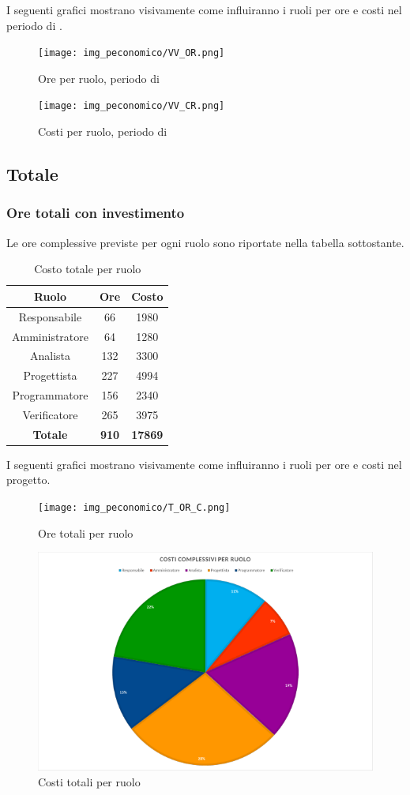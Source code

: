 I seguenti grafici mostrano visivamente come influiranno i ruoli per ore e costi nel periodo di \VV{}.
\begin{figure}[H]
	\centering
	\texttt{[image: img\_peconomico/VV\_OR.png]}
	\caption{Ore per ruolo, periodo di \VV}
\end{figure}
\begin{figure}[H]
	\centering
	\texttt{[image: img\_peconomico/VV\_CR.png]}
	\caption{Costi per ruolo, periodo di \VV}
\end{figure}

\subsection{Totale}
\subsubsection{Ore totali con investimento}
Le ore complessive previste per ogni ruolo sono riportate nella tabella sottostante.
\begin{table}[H]
	\centering
	\begin{tabular}{|c|c|c|}
		\hline
		\textbf{Ruolo} &
		\textbf{Ore} &
		\textbf{Costo} \\
		\hline
		Responsabile & 66 & 1980\\
		\hline
		Amministratore & 64 & 1280\\
		\hline
		Analista & 132 & 3300\\
		\hline
		Progettista & 227 & 4994 \\
		\hline
		Programmatore & 156 & 2340 \\
		\hline
		Verificatore & 265 & 3975\\
		\hline
		\textbf{Totale} & \textbf{910} & \textbf{17869} \\
		\hline
	\end{tabular}
	\caption{Costo totale per ruolo}
\end{table}
I seguenti grafici mostrano visivamente come influiranno i ruoli per ore e costi nel progetto.
\begin{figure}[H]
	\centering
	\texttt{[image: img\_peconomico/T\_OR\_C.png]}
	\caption{Ore totali per ruolo}
\end{figure}
\begin{figure}[H]
	\centering
	\includegraphics[width=14cm]{img_peconomico/T_CR_C.png}
	\caption{Costi totali per ruolo}
\end{figure}

